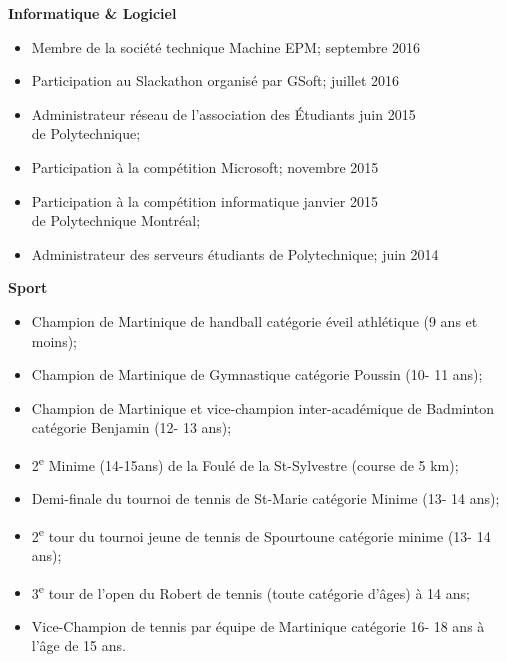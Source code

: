 \documentclass[margin]{res}
\begin{document}
\begin{resume}
  {\bf Informatique \& Logiciel}
  \begin{itemize} \itemsep -2pt %
  \item Membre de la soci\'et\'e technique Machine EPM; \hfill septembre 2016
  \item Participation au Slackathon organis\'e par GSoft; \hfill juillet 2016
  \item Administrateur r\'eseau de l'association des \'Etudiants \hfill juin 2015 \\
  de Polytechnique;
  \item Participation \`a la comp\'etition Microsoft; \hfill novembre 2015
  \item Participation \`a la comp\'etition informatique \hfill janvier 2015
  \\ de Polytechnique Montr\'eal;
  \item Administrateur des serveurs \'etudiants de Polytechnique; \hfill juin 2014
  \end{itemize}

  {\bf Sport}
  \begin{itemize} \itemsep -2pt %
  \item Champion de Martinique de handball cat\'egorie \'eveil athl\'etique (9 ans et moins);
  \item Champion de Martinique de Gymnastique cat\'egorie Poussin (10- 11 ans);
  \item Champion de Martinique et vice-champion inter-acad\'emique de Badminton cat\'egorie Benjamin (12- 13 ans);
  \item 2\textsuperscript{e} Minime (14-15ans) de la Foul\'e de la St-Sylvestre (course de 5 km);
  \item Demi-finale du tournoi de tennis de St-Marie cat\'egorie Minime (13- 14 ans);
  \item 2\textsuperscript{e} tour du tournoi jeune de tennis de Spourtoune cat\'egorie minime (13- 14 ans);
  \item 3\textsuperscript{e} tour de l’open du Robert de tennis (toute cat\'egorie d'\^ages) à 14 ans;
  \item Vice-Champion de tennis par \'equipe de Martinique cat\'egorie 16- 18 ans \`a l'\^age de 15 ans.
  \end{itemize}


\end{resume}
\end{document}
